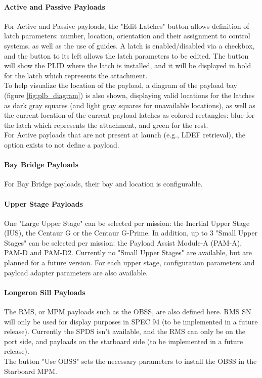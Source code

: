 \documentclass[Space_Shuttle_Vessel_Manual.tex]{subfiles}
\begin{document}
\begin{multicols*}{2}
\paragraph{Active and Passive Payloads}
For Active and Passive payloads, the "Edit Latches" button allows definition of latch parameters: number, location, orientation and their assignment to control systems, as well as the use of guides. A latch is enabled/disabled via a checkbox, and the button to its left allows the latch parameters to be edited. The button will show the PLID where the latch is installed, and it will be displayed in bold for the latch which represents the attachment.\\
To help visualize the location of the payload, a diagram of the payload bay (figure \ref{fig:plb_diagram}) is also shown, displaying valid locations for the latches as dark gray squares (and light gray squares for unavailable locations), as well as the current location of the current payload latches as colored rectangles: blue for the latch which represents the attachment, and green for the rest.\\
For Active payloads that are not present at launch (e.g., LDEF retrieval), the option exists to not define a payload.

\paragraph{Bay Bridge Payloads}
For Bay Bridge payloads, their bay and location is configurable.

\paragraph{Upper Stage Payloads}
One "Large Upper Stage" can be selected per mission: the Inertial Upper Stage (IUS), the Centaur G or the Centaur G-Prime. In addition, up to 3 "Small Upper Stages" can be selected per mission: the Payload Assist Module-A (PAM-A), PAM-D and PAM-D2. Currently no "Small Upper Stages" are available, but are planned for a future version. For each upper stage, configuration parameters and payload adapter parameters are also available.

\paragraph{Longeron Sill Payloads}
The RMS, or MPM payloads such as the OBSS, are also defined here. RMS SN will only be used for display purposes in SPEC 94 (to be implemented in a future release). Currently the SPDS isn't available, and the RMS can only be on the port side, and payloads on the starboard side (to be implemented in a future release).\\
The button "Use OBSS" sets the necessary parameters to install the OBSS in the Starboard MPM.



\end{multicols*}
\end{document}
